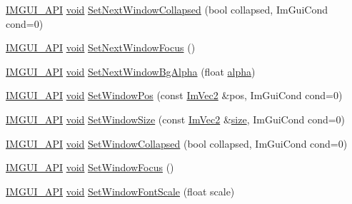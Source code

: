 \begin{DoxyCompactItemize}
\item 
\hyperlink{imgui_8h_a43829975e84e45d1149597467a14bbf5}{I\+M\+G\+U\+I\+\_\+\+A\+PI} \hyperlink{imgui__impl__opengl3__loader_8h_ac668e7cffd9e2e9cfee428b9b2f34fa7}{void} \hyperlink{namespaceImGui_a3e9380e253a3c49665a404e56950a52a}{Set\+Next\+Window\+Collapsed} (bool collapsed, Im\+Gui\+Cond cond=0)
\item 
\hyperlink{imgui_8h_a43829975e84e45d1149597467a14bbf5}{I\+M\+G\+U\+I\+\_\+\+A\+PI} \hyperlink{imgui__impl__opengl3__loader_8h_ac668e7cffd9e2e9cfee428b9b2f34fa7}{void} \hyperlink{namespaceImGui_ac2d2b163c95cd8c8391aba85bc50d170}{Set\+Next\+Window\+Focus} ()
\item 
\hyperlink{imgui_8h_a43829975e84e45d1149597467a14bbf5}{I\+M\+G\+U\+I\+\_\+\+A\+PI} \hyperlink{imgui__impl__opengl3__loader_8h_ac668e7cffd9e2e9cfee428b9b2f34fa7}{void} \hyperlink{namespaceImGui_a7de5a63cec4babe417f972403db6430c}{Set\+Next\+Window\+Bg\+Alpha} (float \hyperlink{imgui__impl__opengl3__loader_8h_a090ebe65994a3ee4bb60ae3472abffc5}{alpha})
\item 
\hyperlink{imgui_8h_a43829975e84e45d1149597467a14bbf5}{I\+M\+G\+U\+I\+\_\+\+A\+PI} \hyperlink{imgui__impl__opengl3__loader_8h_ac668e7cffd9e2e9cfee428b9b2f34fa7}{void} \hyperlink{namespaceImGui_aaa81e004de4c0a5cedb836e92e8aa0e5}{Set\+Window\+Pos} (const \hyperlink{structImVec2}{Im\+Vec2} \&pos, Im\+Gui\+Cond cond=0)
\item 
\hyperlink{imgui_8h_a43829975e84e45d1149597467a14bbf5}{I\+M\+G\+U\+I\+\_\+\+A\+PI} \hyperlink{imgui__impl__opengl3__loader_8h_ac668e7cffd9e2e9cfee428b9b2f34fa7}{void} \hyperlink{namespaceImGui_a657c6cc2246485332f608a5204447ea1}{Set\+Window\+Size} (const \hyperlink{structImVec2}{Im\+Vec2} \&\hyperlink{imgui__impl__opengl3__loader_8h_a3d1e3edfcf61ca2d831883e1afbad89e}{size}, Im\+Gui\+Cond cond=0)
\item 
\hyperlink{imgui_8h_a43829975e84e45d1149597467a14bbf5}{I\+M\+G\+U\+I\+\_\+\+A\+PI} \hyperlink{imgui__impl__opengl3__loader_8h_ac668e7cffd9e2e9cfee428b9b2f34fa7}{void} \hyperlink{namespaceImGui_ab5445711a74e0e1a58d1e464cdda252f}{Set\+Window\+Collapsed} (bool collapsed, Im\+Gui\+Cond cond=0)
\item 
\hyperlink{imgui_8h_a43829975e84e45d1149597467a14bbf5}{I\+M\+G\+U\+I\+\_\+\+A\+PI} \hyperlink{imgui__impl__opengl3__loader_8h_ac668e7cffd9e2e9cfee428b9b2f34fa7}{void} \hyperlink{namespaceImGui_ac71920931ed7b7c8594ee84c6a94e7b8}{Set\+Window\+Focus} ()
\item 
\hyperlink{imgui_8h_a43829975e84e45d1149597467a14bbf5}{I\+M\+G\+U\+I\+\_\+\+A\+PI} \hyperlink{imgui__impl__opengl3__loader_8h_ac668e7cffd9e2e9cfee428b9b2f34fa7}{void} \hyperlink{namespaceImGui_a11f2f343dbc9b00ccd9e99ebd59cfe8b}{Set\+Window\+Font\+Scale} (float scale)

\end{DoxyCompactItemize}

